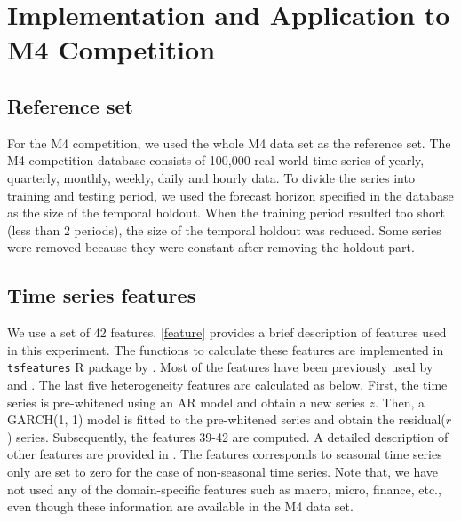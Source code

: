 \documentclass[11pt,a4paper,]{article}
\theoremstyle{definition}
\theoremstyle{definition}
\theoremstyle{definition}
\theoremstyle{remark}
\begin{document}
\section{Implementation and Application to M4
Competition}\label{M4application}

\subsection{Reference set}\label{reference-set}

For the M4 competition, we used the whole M4 data set as the reference
set. The M4 competition database consists of 100,000 real-world time
series of yearly, quarterly, monthly, weekly, daily and hourly data. To
divide the series into training and testing period, we used the forecast
horizon specified in the database as the size of the temporal holdout.
When the training period resulted too short (less than 2 periods), the
size of the temporal holdout was reduced. Some series were removed
because they were constant after removing the holdout part.

\subsection{Time series features}\label{time-series-features}

We use a set of 42 features. \autoref{feature} provides a brief
description of features used in this experiment. The functions to
calculate these features are implemented in \texttt{tsfeatures} R
package by \textcite{tsfeatures}. Most of the features have been
previously used by \textcite{hyndman2015large} and \textcite{fforms}.
The last five heterogeneity features are calculated as below. First, the
time series is pre-whitened using an AR model and obtain a new series
\(z\). Then, a GARCH(1, 1) model is fitted to the pre-whitened series
and obtain the residual(\(r\)) series. Subsequently, the features 39-42
are computed. A detailed description of other features are provided in
\textcite{fforms}. The features corresponds to seasonal time series only
are set to zero for the case of non-seasonal time series. Note that, we
have not used any of the domain-specific features such as macro, micro,
finance, etc., even though these information are available in the M4
data set.
\end{document}
